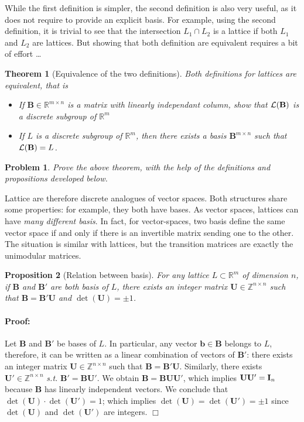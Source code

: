 \documentclass[12pt]{article}
\renewcommand{\vec}{\mathbf}
\newcommand{\Z}{\mathbb Z}
\newcommand{\R}{\mathbb R}
\newtheorem{theorem}{Theorem}{\bfseries}{\upshape}
\newtheorem{proposition}[theorem]{Proposition}{\bfseries}{\upshape}
\newtheorem{problem}{Problem}{\bfseries}{\upshape}
\newenvironment{proof}{\paragraph{Proof:} }{\hfill\qed\\}
\newcommand{\qed}{\hfill \ensuremath{\Box}}
\begin{document}
While the first definition is simpler, the second definition is also very useful, as it does not require to provide an explicit basis. For example, using the second definition, it is trivial to see that the intersection $L_1 \cap L_2$ is a lattice if both $L_1$ and $L_2$ are lattices. But showing that both definition are equivalent requires a bit of effort \dots

\begin{theorem}[Equivalence of the two definitions]
Both definitions for lattices are equivalent, that is
\begin{itemize}
  \item[a.] If $\vec B \in \R^{m \times n}$ is a matrix with linearly independant column, show that $\cL(\vec B)$ is a discrete subgroup of $\R^m$
  \item[b.] If $L$ is a discrete subgroup of $\R^m$, then there exists a basis $\vec B^{m \times n}$ such that $\cL(\vec B) = L$.
\end{itemize}
\end{theorem}
\begin{problem}
  Prove the above theorem, with the help of the definitions and propositions developed below.
\end{problem}

Lattice are therefore discrete analogues of vector spaces. Both structures share some properties: for example, they both have bases. As vector spaces, lattices can have {\em many different basis}. In fact, for vector-spaces, two basis define the same vector space if and only if there is an invertible matrix sending one to the other. The situation is similar with lattices, but the transition matrices are exactly the unimodular matrices.


\begin{proposition}[Relation between basis]
\label{prop:existence_of_basis}
For any lattice $L \subset \R^m$ of dimension $n$,
if $\vec B$ and $\vec B'$ are both basis of $L$, there exists an integer matrix $\vec U \in \Z^{n \times n}$
such that $\vec B = \vec B' \vec U $ and $\det(\vec U) = \pm 1$.
\end{proposition}
\begin{proof}
Let $\vec B$ and $\vec B'$ be bases of $L$. In particular, any vector $\vec b \in \vec B$ belongs to $L$, therefore, it
can be written as a linear combination of vectors of $\vec B'$: there exists an integer matrix $\vec U \in \Z^{n \times n}$ such 
that $\vec B =  \vec B'\vec U$. Similarly, there exists $\vec U' \in \Z^{n \times n}$ {\em s.t.} $\vec B' = \vec B \vec U'$.
We obtain $\vec B = \vec B \vec U \vec U' $, which implies $\vec U \vec U' = \Id_n$ because $\vec B$ has linearly
independent vectors. We conclude that $\det(\vec U) \cdot \det(\vec U')=1$; which implies $\det(\vec U) = \det(\vec U') = \pm 1$
since $\det(\vec U)$ and $\det(\vec U')$ are integers.
\end{proof}
\end{document}
